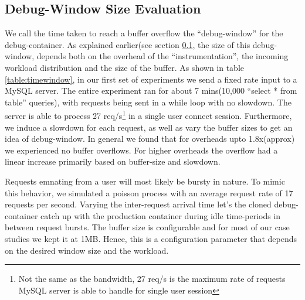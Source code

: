 	


\subsection{Debug-Window Size Evaluation}
\label{sec:timewindowPerformance}

We call the time taken to reach a buffer overflow the ``debug-window'' for the debug-container.
As explained earlier(see section \ref{sec:timewindowPerformance}, the size of this debug-window, depends both on the overhead of the ``instrumentation'', the incoming workload distribution and the size of the buffer.
As shown in table \ref{table:timewindow}, in our first set of experiments we send a fixed rate input to a MySQL server.
The entire experiment ran for about 7 mins(10,000 ``select * from table'' queries), with requests being sent in a while loop with no slowdown.
The server is able to process 27 req/s\footnote{Not the same as the bandwidth, 27 req/s is the maximum rate of requests MySQL server is able to handle for single user session} in a single user connect session. 
Furthermore, we induce a slowdown for each request, as well as vary the buffer sizes to get an idea of debug-window. 
In general we found that for overheads upto 1.8x(approx) we experienced no buffer overflows.
For higher overheads the overflow had a linear increase primarily based on buffer-size and slowdown.

Requests emnating from a user will most likely be bursty in nature.
To mimic this behavior, we simulated a poisson process with an average request rate of 17 requests per second. 
Varying the inter-request arrival time let's the cloned debug-container catch up with the production container during idle time-periods in between request bursts.
The buffer size is configurable and for most of our case studies we kept it at 1MB.
Hence, this is a configuration parameter that depends on the desired window size and the workload.

